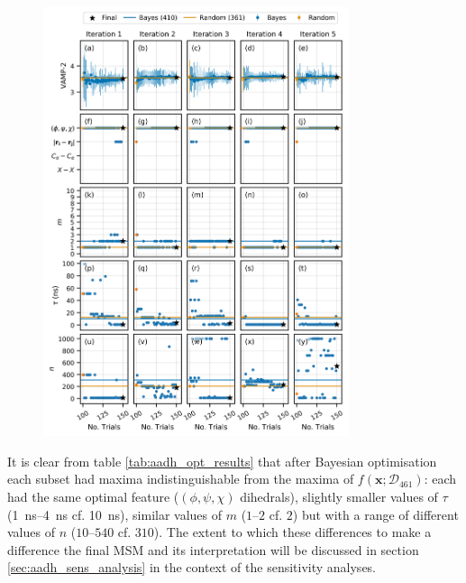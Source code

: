 \begin{figure}[p]
    \centering
    \includegraphics[width=0.8\textwidth]{chapters/msm_optimization/figures/aadh_opt_traj_act_s_d.png}
    \label{fig:aadh_opt_traj_d}
\end{figure}

 It is clear from  table \ref{tab:aadh_opt_results} that after Bayesian optimisation each subset had maxima indistinguishable from the maxima of $f(\mathbf{x};\mathcal{D}_{461})$: each had the same optimal feature ($(\phi, \psi, \chi)$ dihedrals), slightly smaller values of $\tau$ (\SIrange{1}{4}{\nano\second} cf. \SI{10}{\nano\second}), similar values of $m$ ($\numrange{1}{2}$ cf. $2$) but with a range of different values of $n$ ($\numrange{10}{540}$ cf. $310$). The extent to which these differences to make a difference the final MSM and its interpretation will be discussed in section \ref{sec:aadh_sens_analysis} in the context of the sensitivity analyses.

